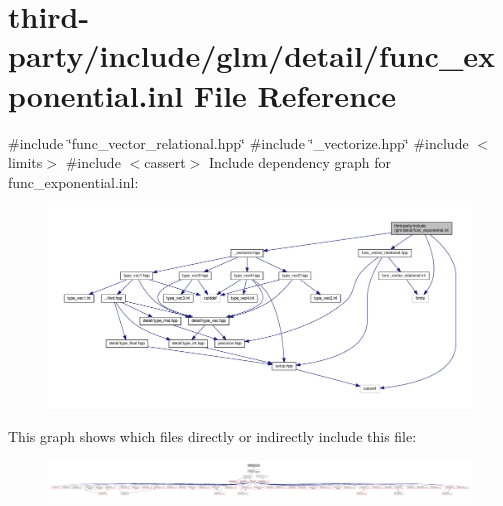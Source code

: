 \hypertarget{func__exponential_8inl}{}\section{third-\/party/include/glm/detail/func\+\_\+exponential.inl File Reference}
\label{func__exponential_8inl}
{\ttfamily \#include \char`\"{}func\+\_\+vector\+\_\+relational.\+hpp\char`\"{}}\newline
{\ttfamily \#include \char`\"{}\+\_\+vectorize.\+hpp\char`\"{}}\newline
{\ttfamily \#include $<$limits$>$}\newline
{\ttfamily \#include $<$cassert$>$}\newline
Include dependency graph for func\+\_\+exponential.\+inl\+:
\nopagebreak
\begin{figure}[H]
\begin{center}
\leavevmode
\includegraphics[width=350pt]{func__exponential_8inl__incl}
\end{center}
\end{figure}
This graph shows which files directly or indirectly include this file\+:
\nopagebreak
\begin{figure}[H]
\begin{center}
\leavevmode
\includegraphics[width=350pt]{func__exponential_8inl__dep__incl}
\end{center}
\end{figure}
